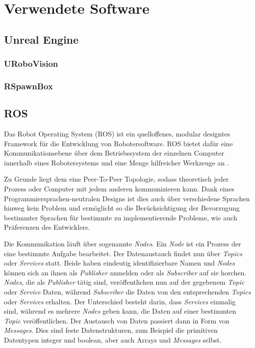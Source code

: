 \graphicspath{{./images/}}      
\def\CHAPTERONE{./chapters/Chapter-1} 

\chapter{Verwendete Software}
\label{chap:software}
%	

\section{Unreal Engine}
\label{chap:unrealengine}

\subsection{URoboVision}
\label{chap:urobovision}

\subsection{RSpawnBox}
\label{chap:rspawnbox}

\section{ROS}
\label{chap:ros}

Das Robot Operating System (ROS) ist ein quelloffenes, modular designtes Framework für die Entwicklung von Robotersoftware. ROS bietet dafür eine Kommunikationsebene über dem Betriebssystem der einzelnen Computer innerhalb eines Robotersystems und eine Menge hilfreicher Werkzeuge an \cite{qui}.\par 

Zu Grunde liegt dem eine Peer-To-Peer Topologie, sodass theoretisch jeder Prozess oder Computer mit jedem anderen kommunizieren kann. Dank eines Programmiersprachen-neutralen Designs ist dies auch über verschiedene Sprachen hinweg kein Problem und ermöglicht so die Berücksichtigung der Bevorzugung bestimmter Sprachen für bestimmte zu implementierende Probleme, wie auch Präferenzen des Entwicklers.\par

Die Kommunikation läuft über sogenannte \textit{Nodes}. Ein \textit{Node} ist ein Prozess der eine bestimmte Aufgabe bearbeitet. Der Datenaustauch findet nun über \textit{Topics} oder \textit{Services} statt. Beide haben eindeutig identifizierbare Namen und \textit{Nodes} können sich an ihnen als \textit{Publisher} anmelden oder als \textit{Subscriber} auf sie horchen. \textit{Nodes}, die als \textit{Publisher} tätig sind, veröffentlichen nun auf der gegebenem \textit{Topic} oder \textit{Service} Daten, während \textit{Subscriber} die Daten von den entsprechenden \textit{Topics} oder \textit{Services} erhalten. Der Unterschied besteht darin, dass \textit{Services} einmalig sind, während es mehrere \textit{Nodes} geben kann, die Daten auf einer bestimmten \textit{Topic} veröffentlichen. Der Austausch von Daten passiert dann in Form von \textit{Messages}. Dies sind feste Datenstrukturen, zum Beispiel die primitiven Datentypen integer und boolean, aber auch Arrays und \textit{Messages} selbst. \par

